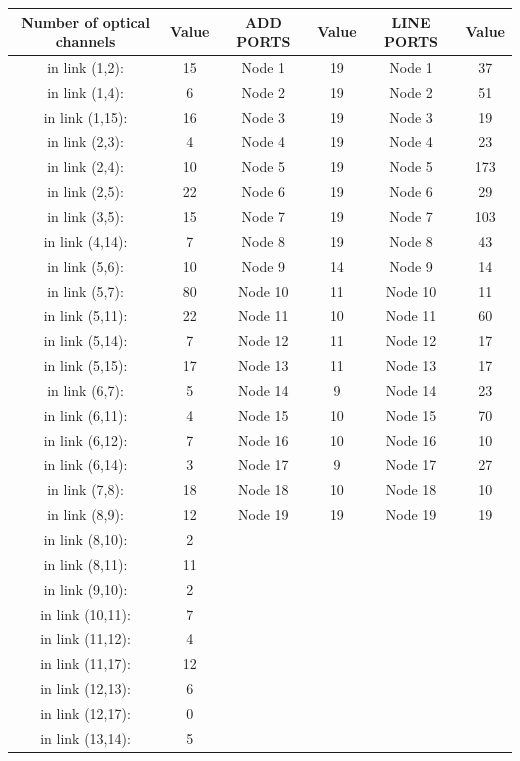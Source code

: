 \begin{table}[h!]
\centering
\begin{tabular}{|| c | c || c | c || c | c ||}
 \hline
 Number of optical channels & Value & ADD PORTS & Value & LINE PORTS & Value \\
 \hline\hline
in link (1,2): & 15& Node 1 & 19 & Node 1 & 37 \\
in link (1,4): & 6& Node 2 & 19 & Node 2 & 51 \\
in link (1,15): & 16& Node 3 & 19 & Node 3 & 19 \\
in link (2,3): & 4& Node 4 & 19 & Node 4 & 23 \\
in link (2,4): & 10& Node 5 & 19 & Node 5 & 173 \\
in link (2,5): & 22& Node 6 & 19 & Node 6 & 29 \\
in link (3,5): & 15& Node 7 & 19 & Node 7 & 103 \\
in link (4,14): & 7& Node 8 & 19 & Node 8 & 43 \\
in link (5,6): & 10& Node 9 & 14 & Node 9 & 14 \\
in link (5,7): & 80& Node 10 & 11 & Node 10 & 11 \\
in link (5,11): & 22& Node 11 & 10 & Node 11 & 60 \\
in link (5,14): & 7& Node 12 & 11 & Node 12 & 17 \\
in link (5,15): & 17& Node 13 & 11 & Node 13 & 17 \\
in link (6,7): & 5& Node 14 & 9 & Node 14 & 23 \\
in link (6,11): & 4& Node 15 & 10 & Node 15 & 70 \\
in link (6,12): & 7& Node 16 & 10 & Node 16 & 10 \\
in link (6,14): & 3& Node 17 & 9 & Node 17 & 27 \\
in link (7,8): & 18& Node 18 & 10 & Node 18 & 10 \\
in link (8,9): & 12& Node 19 & 19 & Node 19 & 19 \\
in link (8,10): & 2& & & & \\
in link (8,11): & 11& & & & \\
in link (9,10): & 2& & & & \\
in link (10,11): & 7& & & & \\
in link (11,12): & 4& & & & \\
in link (11,17): & 12& & & & \\
in link (12,13): & 6& & & & \\
in link (12,17): & 0& & & & \\
in link (13,14): & 5& & & & \\

\end{tabular}
\end{table}
